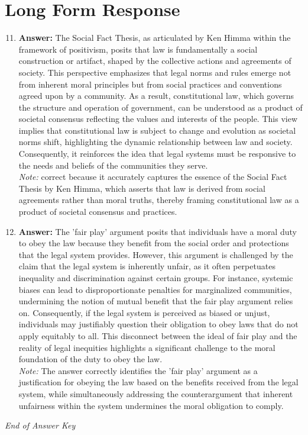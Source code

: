\documentclass[12pt]{article}
\begin{document}
\section*{Long Form Response}
\begin{enumerate}[label=\arabic*.]
\setcounter{enumi}{10}
\item \textbf{Answer:} The Social Fact Thesis, as articulated by Ken Himma within the framework of positivism, posits that law is fundamentally a social construction or artifact, shaped by the collective actions and agreements of society. This perspective emphasizes that legal norms and rules emerge not from inherent moral principles but from social practices and conventions agreed upon by a community. As a result, constitutional law, which governs the structure and operation of government, can be understood as a product of societal consensus reflecting the values and interests of the people. This view implies that constitutional law is subject to change and evolution as societal norms shift, highlighting the dynamic relationship between law and society. Consequently, it reinforces the idea that legal systems must be responsive to the needs and beliefs of the communities they serve.
\\ \textit{Note:} correct because it accurately captures the essence of the Social Fact Thesis by Ken Himma, which asserts that law is derived from social agreements rather than moral truths, thereby framing constitutional law as a product of societal consensus and practices.
\item \textbf{Answer:} The 'fair play' argument posits that individuals have a moral duty to obey the law because they benefit from the social order and protections that the legal system provides. However, this argument is challenged by the claim that the legal system is inherently unfair, as it often perpetuates inequality and discrimination against certain groups. For instance, systemic biases can lead to disproportionate penalties for marginalized communities, undermining the notion of mutual benefit that the fair play argument relies on. Consequently, if the legal system is perceived as biased or unjust, individuals may justifiably question their obligation to obey laws that do not apply equitably to all. This disconnect between the ideal of fair play and the reality of legal inequities highlights a significant challenge to the moral foundation of the duty to obey the law.
\\ \textit{Note:} The answer correctly identifies the 'fair play' argument as a justification for obeying the law based on the benefits received from the legal system, while simultaneously addressing the counterargument that inherent unfairness within the system undermines the moral obligation to comply.
\end{enumerate}

\vfill
\noindent\textit{End of Answer Key}
\end{document}
